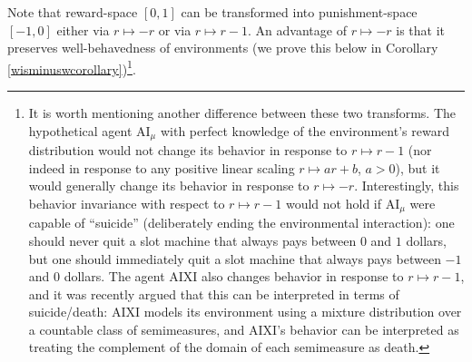 \documentclass[runningheads]{llncs}
\begin{document}
Note that reward-space $[0,1]$ can be transformed into punishment-space
$[-1,0]$ either via $r\mapsto -r$ or via $r\mapsto r-1$.
An advantage of $r\mapsto -r$ is that it preserves well-behavedness of
environments (we prove this below in
Corollary \ref{wisminuswcorollary})\footnote{It
is worth mentioning another difference
between these two transforms. The hypothetical agent
$\mathrm{AI}_\mu$ with perfect knowledge of the environment's reward distribution
would not change its behavior in response to $r\mapsto r-1$ (nor indeed
in response to any positive linear scaling $r\mapsto ar+b$, $a>0$), but it would
generally change its behavior in response to $r\mapsto -r$. Interestingly, this
behavior invariance
with respect to $r\mapsto r-1$ would not hold if $\mathrm{AI}_\mu$ were capable of
``suicide'' (deliberately ending the environmental interaction):
one should never quit a slot machine that always pays between $0$ and $1$
dollars, but one should immediately quit a slot machine that always pays
between $-1$ and $0$ dollars.
The agent
AIXI also changes behavior in response to $r\mapsto r-1$, and it was recently argued
\cite{martin2016death} that
this can be interpreted in terms of suicide/death: AIXI models its environment using a mixture
distribution over a countable class of semimeasures, and AIXI's behavior can be interpreted
as treating the complement of the domain of each semimeasure as death.}.


\end{document}
